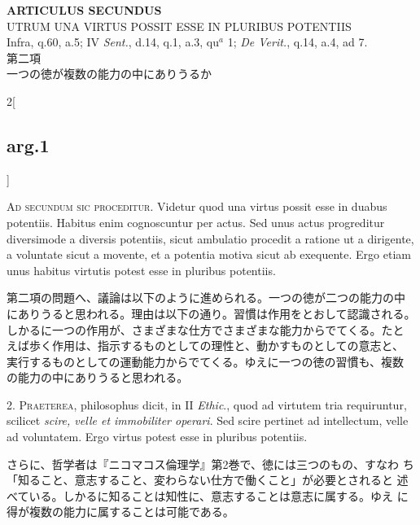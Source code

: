 \documentclass[paper=a4paper,fontsize=10pt,jafontsize=9pt,titlepage]{jlreq}
\begin{document}
\begin{center}
{\Large {\bfseries ARTICULUS SECUNDUS}}\\
{\large UTRUM UNA VIRTUS POSSIT ESSE IN PLURIBUS POTENTIIS}\\
{\footnotesize Infra, q.60, a.5; IV {\itshape Sent.}, d.14, q.1, a.3, qu$^{a}$ 1; {\itshape De Verit.}, q.14, a.4, ad 7.}\\
{\Large 第二項\\一つの徳が複数の能力の中にありうるか}
\end{center}

\begin{paracol}{2}[\subsection{arg.1}]

{\scshape Ad secundum sic proceditur}. Videtur quod una virtus possit
esse in duabus potentiis. Habitus enim cognoscuntur per actus. Sed
unus actus progreditur diversimode a diversis potentiis, sicut
ambulatio procedit a ratione ut a dirigente, a voluntate sicut a
movente, et a potentia motiva sicut ab exequente. Ergo etiam unus
habitus virtutis potest esse in pluribus potentiis.

\switchcolumn

第二項の問題へ、議論は以下のように進められる。一つの徳が二つの能力の中
にありうると思われる。理由は以下の通り。習慣は作用をとおして認識される。
しかるに一つの作用が、さまざまな仕方でさまざまな能力からでてくる。たと
えば歩く作用は、指示するものとしての理性と、動かすものとしての意志と、
実行するものとしての運動能力からでてくる。ゆえに一つの徳の習慣も、複数
の能力の中にありうると思われる。


2. {\scshape Praeterea}, philosophus dicit, in II {\itshape Ethic}.,
quod ad virtutem tria requiruntur, scilicet {\itshape scire, velle et
immobiliter operari}. Sed scire pertinet ad intellectum, velle ad
voluntatem. Ergo virtus potest esse in pluribus potentiis.

\switchcolumn

さらに、哲学者は『ニコマコス倫理学』第2巻で、徳には三つのもの、すなわ
ち「知ること、意志すること、変わらない仕方で働くこと」が必要とされると
述べている。しかるに知ることは知性に、意志することは意志に属する。ゆえ
に得が複数の能力に属することは可能である。


\end{paracol}
\end{document}
